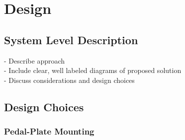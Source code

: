 \documentclass{article}
\begin{document}
\section{Design}
	\subsection{System Level Description}
	- Describe approach \\
	- Include clear, well labeled diagrams of proposed solution \\
	- Discuss considerations and design choices \\
	\subsection{Design Choices}
		\subsubsection{Pedal-Plate Mounting}
\end{document}

